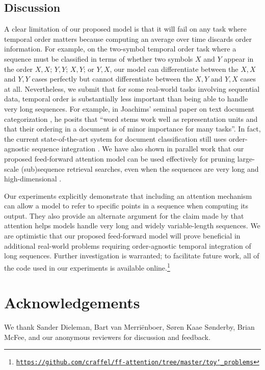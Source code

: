 \documentclass{article} %
\begin{document}
\subsection{Discussion}
\label{sec:discussion}

A clear limitation of our proposed model is that it will fail on any task where temporal order matters because computing an average over time discards order information.
For example, on the two-symbol temporal order task \citep{hochreiter1997long} where a sequence must be classified in terms of whether two symbols $X$ and $Y$ appear in the order $X, X$; $Y, Y$; $X, Y$; or $Y, X$, our model can differentiate between the $X, X$ and $Y, Y$ cases perfectly but cannot differentiate between the $X, Y$ and $Y, X$ cases at all.
Nevertheless, we submit that for some real-world tasks involving sequential data, temporal order is substantially less important than being able to handle very long sequences.
For example, in Joachims' seminal paper on text document categorization \citep{joachims1998text}, he posits that ``word stems work well as representation units and that their ordering in a document is of minor importance for many tasks''.
In fact, the current state-of-the-art system for document classification still uses order-agnostic sequence integration \citep{lei2015molding}.
We have also shown in parallel work that our proposed feed-forward attention model can be used effectively for pruning large-scale (sub)sequence retrieval searches, even when the sequences are very long and high-dimensional \citep{raffel2016pruning}.

Our experiments explicitly demonstrate that including an attention mechanism can allow a model to refer to specific points in a sequence when computing its output.
They also provide an alternate argument for the claim made by \cite{bahdanau2014neural} that attention helps models handle very long and widely variable-length sequences.
We are optimistic that our proposed feed-forward model will prove beneficial in additional real-world problems requiring order-agnostic temporal integration of long sequences.
Further investigation is warranted; to facilitate future work, all of the code used in our experiments is available online.\footnote{\href{https://github.com/craffel/ff-attention/tree/master/toy_problems}{\texttt{https://github.com/craffel/ff-attention/tree/master/toy\char`_problems}}}

\section{Acknowledgements}

We thank Sander Dieleman, Bart van Merri{\"e}nboer, S{\o}ren Kaae S{\o}nderby, Brian McFee, and our anonymous reviewers for discussion and feedback.

\clearpage



\end{document}
